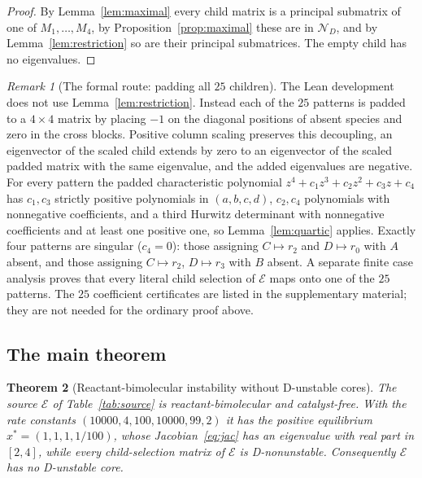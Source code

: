 \documentclass[11pt,a4paper]{article}
\theoremstyle{plain}
\newtheorem{theorem}{Theorem}[section]
\theoremstyle{definition}
\theoremstyle{remark}
\newtheorem{remark}[theorem]{Remark}
\newcommand{\DN}{\mathcal{N}_D}
\newcommand{\xs}{x^{*}}
\begin{document}
\begin{proof}
By Lemma~\ref{lem:maximal} every child matrix is a principal submatrix of one of $M_1,\dots,M_4$, by Proposition~\ref{prop:maximal} these are in $\DN$, and by Lemma~\ref{lem:restriction} so are their principal submatrices. The empty child has no eigenvalues.
\end{proof}

\begin{remark}[The formal route: padding all $25$ children]\label{rem:padding}
The Lean development does not use Lemma~\ref{lem:restriction}. Instead each of the $25$ patterns is padded to a $4\times4$ matrix by placing $-1$ on the diagonal positions of absent species and zero in the cross blocks. Positive column scaling preserves this decoupling, an eigenvector of the scaled child extends by zero to an eigenvector of the scaled padded matrix with the same eigenvalue, and the added eigenvalues are negative. For every pattern the padded characteristic polynomial $z^4+c_1z^3+c_2z^2+c_3z+c_4$ has $c_1,c_3$ strictly positive polynomials in $(a,b,c,d)$, $c_2,c_4$ polynomials with nonnegative coefficients, and a third Hurwitz determinant with nonnegative coefficients and at least one positive one, so Lemma~\ref{lem:quartic} applies. Exactly four patterns are singular ($c_4=0$): those assigning $C\mapsto r_2$ and $D\mapsto r_0$ with $A$ absent, and those assigning $C\mapsto r_2$, $D\mapsto r_3$ with $B$ absent. A separate finite case analysis proves that every literal child selection of $\mathcal E$ maps onto one of the $25$ patterns. The $25$ coefficient certificates are listed in the supplementary material; they are not needed for the ordinary proof above.
\end{remark}

\subsection{The main theorem}

\begin{theorem}[Reactant-bimolecular instability without D-unstable cores]\label{thm:main}
The source $\mathcal E$ of Table~\ref{tab:source} is reactant-bimolecular and catalyst-free. With the rate constants $(10000,4,100,10000,99,2)$ it has the positive equilibrium $\xs=(1,1,1,1/100)$, whose Jacobian~\eqref{eq:jac} has an eigenvalue with real part in $[2,4]$, while every child-selection matrix of $\mathcal E$ is D-nonunstable. Consequently $\mathcal E$ has no D-unstable core.
\end{theorem}
\end{document}
